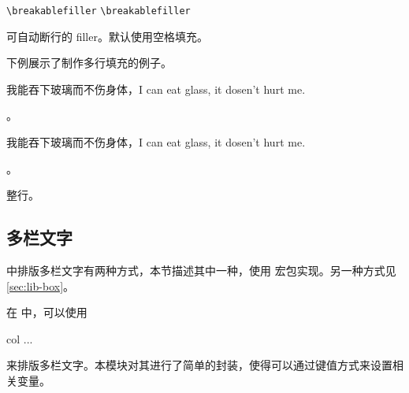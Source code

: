 \documentclass[twoside]{book}
\def\xampletext{\par}
\def\xampleprint{\xamplecode \xampleline \xampletext}
\begin{document}
\begin{function}{\breakablefiller}
  \begin{syntax}
    \verb|\breakablefiller|
    \verb|\breakablefiller| 
  \end{syntax}
可自动断行的 filler。默认使用空格填充。
\end{function}

\begin{xample}
 \breakablefiller[cdotted=1em] 

 \breakablefiller[cdotted=1em] 
\stopxamplecode
\xampleprint
\end{xample}

下例展示了制作多行填充的例子。
\begin{xample}
\newcommand\filllines[4][]{{%
  #2\filler[#1]%
  \Replicate{#3-1}{\break \rule{0pt}{0.7\baselineskip}\filler[#1]}%
  #4\par}}

我能吞下玻璃而不伤身体，I can eat glass, it dosen't hurt me.
\filllines{\linespread{2}\selectfont}{3}{。\hspace*{1em}}

我能吞下玻璃而不伤身体，I can eat glass, it dosen't hurt me.
\filllines[color=red,dotted]{\linespread{2}\selectfont}{3}{。\hspace*{1em}}

\filllines [raise=-.5ex]{\linespread{2}\selectfont \noindent\strut}{3}{ 整行。\hspace*{1em}}
\stopxamplecode
\xampleprint  
\end{xample}


\subsection{多栏文字}\label{sec:multicol}

\WhuTeX 中排版多栏文字有两种方式，本节描述其中一种，使用  宏包实现。另一种方式见\cref{sec:lib-box}。

在  中，可以使用 
\begin{xample}
\begin{multicols}{col}
  ... 
\end{multicols}
\stopxamplecode 
\xamplecode \medskip 
\end{xample}
来排版多栏文字。本模块对其进行了简单的封装，使得可以通过键值方式来设置相关变量。
\end{document}
